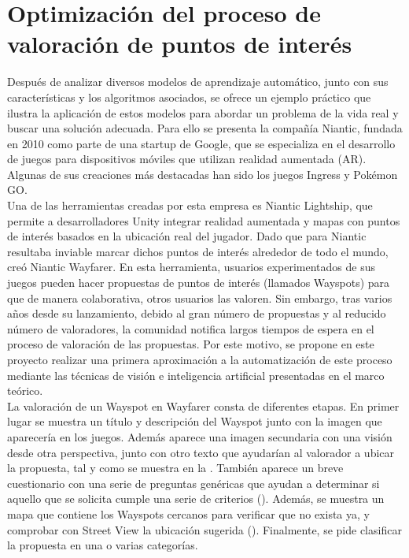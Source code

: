\chapter{Optimización del proceso de valoración de puntos de interés}

	Después de analizar diversos modelos de aprendizaje automático, junto con sus características y los algoritmos asociados, se ofrece un ejemplo práctico que ilustra la aplicación de estos modelos para abordar un problema de la vida real y buscar una solución adecuada. Para ello se presenta la compañía Niantic, fundada en 2010 como parte de una startup de Google, que se especializa en el desarrollo de juegos para dispositivos móviles que utilizan realidad aumentada (AR). Algunas de sus creaciones más destacadas han sido los juegos Ingress y Pokémon GO. \\
	
	Una de las herramientas creadas por esta empresa es Niantic Lightship, que permite a desarrolladores Unity integrar realidad aumentada y mapas con puntos de interés basados en la ubicación real del jugador. Dado que para Niantic resultaba inviable marcar dichos puntos de interés alrededor de todo el mundo, creó Niantic Wayfarer. En esta herramienta, usuarios experimentados de sus juegos pueden hacer propuestas de puntos de interés (llamados Wayspots) para que de manera colaborativa, otros usuarios las valoren. Sin embargo, tras varios años desde su lanzamiento, debido al gran número de propuestas y al reducido número de valoradores, la comunidad notifica largos tiempos de espera en el proceso de valoración de las propuestas. Por este motivo, se propone en este proyecto realizar una primera aproximación a la automatización de este proceso mediante las técnicas de visión e inteligencia artificial presentadas en el marco teórico. \\
	
	La valoración de un Wayspot en Wayfarer consta de diferentes etapas. En primer lugar se muestra un título y descripción del Wayspot junto con la imagen que aparecería en los juegos. Además aparece una imagen secundaria con una visión desde otra perspectiva, junto con otro texto que ayudarían al valorador a ubicar la propuesta, tal y como se muestra en la . También aparece un breve cuestionario con una serie de preguntas genéricas que ayudan a determinar si aquello que se solicita cumple una serie de criterios (). Además, se muestra un mapa que contiene los Wayspots cercanos para verificar que no exista ya, y comprobar con Street View la ubicación sugerida (). Finalmente, se pide clasificar la propuesta en una o varias categorías. 
	
